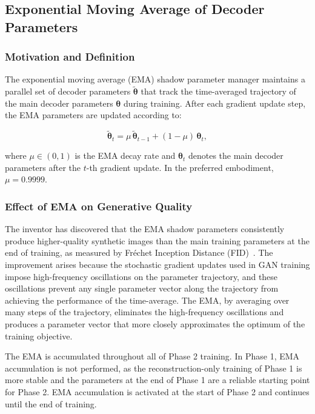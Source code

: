\documentclass[12pt,letterpaper]{article}
\newcommand{\btheta}{\bm{\theta}}
\begin{document}
\subsection{Exponential Moving Average of Decoder Parameters}

\subsubsection{Motivation and Definition}

The exponential moving average (EMA) shadow parameter manager maintains a
parallel set of decoder parameters $\tilde{\btheta}$ that track the
time-averaged trajectory of the main decoder parameters $\btheta$ during
training. After each gradient update step, the EMA parameters are updated
according to:

\begin{equation}
  \tilde{\btheta}_t = \mu\,\tilde{\btheta}_{t-1} + (1 - \mu)\,\btheta_t,
  \label{eq:ema}
\end{equation}

\noindent where $\mu \in (0,1)$ is the EMA decay rate and $\btheta_t$ denotes
the main decoder parameters after the $t$-th gradient update. In the preferred
embodiment, $\mu = 0.9999$.

\subsubsection{Effect of EMA on Generative Quality}

The inventor has discovered that the EMA shadow parameters consistently produce
higher-quality synthetic images than the main training parameters at the end of
training, as measured by Fr\'{e}chet Inception Distance (FID)~\cite{heusel2017}.
The improvement arises because the stochastic gradient updates used in GAN
training impose high-frequency oscillations on the parameter trajectory, and
these oscillations prevent any single parameter vector along the trajectory from
achieving the performance of the time-average. The EMA, by averaging over many
steps of the trajectory, eliminates the high-frequency oscillations and produces
a parameter vector that more closely approximates the optimum of the training
objective.

The EMA is accumulated throughout all of Phase 2 training. In Phase 1, EMA
accumulation is not performed, as the reconstruction-only training of Phase 1
is more stable and the parameters at the end of Phase 1 are a reliable starting
point for Phase 2. EMA accumulation is activated at the start of Phase 2 and
continues until the end of training.
\end{document}
